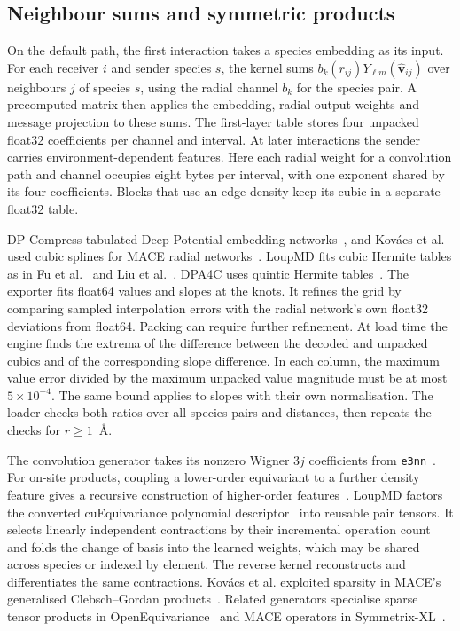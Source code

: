 \subsection{Neighbour sums and symmetric products}
On the default path, the first interaction takes a species embedding as its input. For each receiver $i$ and sender species $s$, the kernel sums $b_k(r_{ij})Y_{\ell m}(\widehat{\mathbf v}_{ij})$ over neighbours $j$ of species $s$, using the radial channel $b_k$ for the species pair. A precomputed matrix then applies the embedding, radial output weights and message projection to these sums. The first-layer table stores four unpacked float32 coefficients per channel and interval. At later interactions the sender carries environment-dependent features. Here each radial weight for a convolution path and channel occupies eight bytes per interval, with one exponent shared by its four coefficients. Blocks that use an edge density keep its cubic in a separate float32 table.

DP Compress tabulated Deep Potential embedding networks~\cite{lu2022dpcompress}, and Kov\'acs et al. used cubic splines for MACE radial networks~\cite[\S III.5]{kovacs2025maceoff}. LoupMD fits cubic Hermite tables as in Fu et al.~\cite[App.~B]{fu2026symmetrixxl} and Liu et al.~\cite[\S 3.6]{liu2026foundation}. DPA4C uses quintic Hermite tables~\cite[\S 4.4, Supplement S2.2]{li2026dpa4c}. The exporter fits float64 values and slopes at the knots. It refines the grid by comparing sampled interpolation errors with the radial network's own float32 deviations from float64. Packing can require further refinement. At load time the engine finds the extrema of the difference between the decoded and unpacked cubics and of the corresponding slope difference. In each column, the maximum value error divided by the maximum unpacked value magnitude must be at most $5\times10^{-4}$. The same bound applies to slopes with their own normalisation. The loader checks both ratios over all species pairs and distances, then repeats the checks for $r\geq1$~\AA{}.

The convolution generator takes its nonzero Wigner $3j$ coefficients from \texttt{e3nn}~\cite{geiger2022e3nn}. For on-site products, coupling a lower-order equivariant to a further density feature gives a recursive construction of higher-order features~\cite[Eq.~4]{nigam2020recursive}. LoupMD factors the converted cuEquivariance polynomial descriptor~\cite{nvidia2026cueq} into reusable pair tensors. It selects linearly independent contractions by their incremental operation count and folds the change of basis into the learned weights, which may be shared across species or indexed by element. The reverse kernel reconstructs and differentiates the same contractions. Kov\'acs et al. exploited sparsity in MACE's generalised Clebsch--Gordan products~\cite[\S III.5]{kovacs2025maceoff}. Related generators specialise sparse tensor products in OpenEquivariance~\cite{bharadwaj2025oeq} and MACE operators in Symmetrix-XL~\cite[\S 4]{fu2026symmetrixxl}.

